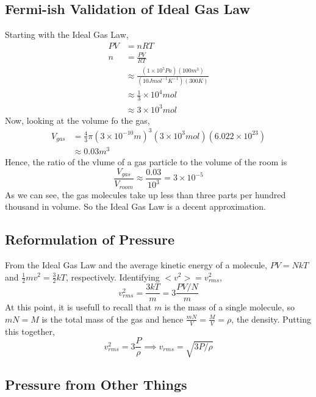 \documentclass{article}
\begin{document}
\subsection{Fermi-ish Validation of Ideal Gas Law}

Starting with the Ideal Gas Law,
\begin{align*}
PV &= nRT \\
n &= \frac{PV}{RT} \\
&\approx \frac{(1\times10^5 Pa)(100 m^3)}{(10 J mol^{-1} K^{-1})(300 K)} \\
&\approx \frac{1}{3}\times10^4 mol \\
&\approx 3\times10^3 mol
\end{align*}
Now, looking at the volume fo the gas,
\begin{align*}
V_{gas} &= \frac{4}{3}\pi (3\times10^{-10} m)^3(3\times 10^3 mol)(6.022\times10^{23}) \\
&\approx 0.03 m^3
\end{align*}
Hence, the ratio of the vlume of a gas particle to the volume of the room is
\begin{equation}
\frac{V_{gas}}{V_{room}} \approx \frac{0.03}{10^3} = 3\times 10^{-5}
\end{equation}
As we can see, the gas molecules take up less than three parts per hundred thousand in volume. So the Ideal Gas Law is a decent approximation.

\subsection{Reformulation of Pressure}

From the Ideal Gas Law and the average kinetic energy of a molecule, $PV = NkT$ and $\frac{1}{2} mv^2 = \frac{3}{2}kT$, respectively. Identifying $<v^2> = v_{rms}^2$,
\begin{equation}
v_{rms}^2 = \frac{3kT}{m} = 3\frac{PV/N}{m}
\end{equation}
At this point, it is usefull to recall that $m$ is the mass of a single molecule, so $mN=M$ is the total mass of the gas and hence $\frac{mN}{V} = \frac{M}{V} = \rho$, the density. Putting this together,
\begin{equation}
v_{rms}^2 = 3\frac{P}{\rho} \implies v_{rms} = \sqrt{3P/\rho}
\end{equation}

\subsection{Pressure from Other Things}
\end{document}
